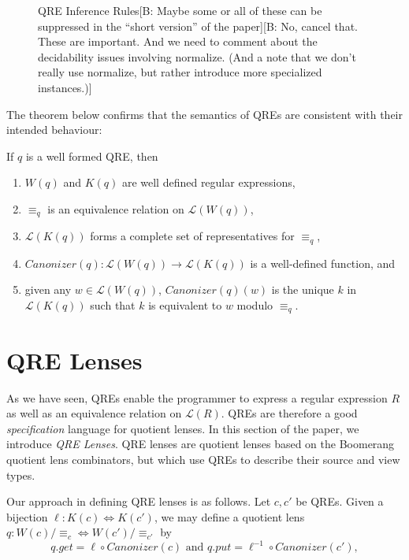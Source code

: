 \documentclass{svproc}
\newcommand{\FINISH}[3]{\ifdraft\textcolor{#1}{[#2: #3]}\fi}
\newcommand{\bcp}[1]{\FINISH{dkred}{B}{#1}}
\newcommand{\canonizer}{\ensuremath{\mathit{Canonizer}}}
\newcommand{\eqrel}[1]{\ensuremath{\equiv_{#1}}}
\begin{document}
\begin{figure}[t]
  \begin{prooftree}
  \end{prooftree}
  \caption{QRE Inference Rules\bcp{Maybe some or all of these can be
      suppressed in the ``short version'' of the paper}\bcp{No, cancel
      that.  These are important.  And we need to comment about the decidability
      issues involving normalize.  (And a note that we don't really use
      normalize, but rather introduce more specialized instances.)}}
  \label{fig:qrerules}
\end{figure}
The theorem below confirms that the semantics of QREs are consistent with their
intended behaviour:
\begin{theorem}
  If $q$ is a well formed QRE, then
  \begin{enumerate}
  \item $W(q)$ and $K(q)$ are well defined regular expressions,
  \item  $\eqrel{q}$ is an equivalence relation on $\mathcal{L}(W(q))$,
  \item  $\mathcal{L}(K(q))$ forms a complete set of representatives for
    $\eqrel{q}$,
  \item $\canonizer(q):\mathcal{L}(W(q)) \longrightarrow \mathcal{L}(K(q))$ is a
    well-defined function, and
  \item  given any $w \in \mathcal{L}(W(q))$, $\canonizer(q)(w)$ is the unique
    $k$ in $\mathcal{L}(K(q))$ such that $k$ is equivalent to $w$ modulo
    $\eqrel{q}$.
  \end{enumerate}
\end{theorem}

\section{QRE Lenses}
\label{QRE-lenses} 
As we have seen, QREs enable the programmer to express a regular expression $R$
as well as an equivalence relation on $\mathcal{L}(R)$. QREs are therefore a
good \textit{specification} language for quotient lenses. In this section of the
paper, we introduce \textit{QRE Lenses}. QRE lenses are quotient lenses based on
the Boomerang quotient lens combinators, but which use QREs to describe their
source and view types.

Our approach in defining QRE lenses is as follows. Let $c, c'$ be QREs. Given a
bijection $\ell : K(c) \Leftrightarrow K(c')$, we may define a quotient lens $q
: W(c)/\eqrel{c} \Leftrightarrow W(c')/\eqrel{c'}$ by
\begin{equation}\label{normalform}
  q.get = \ell \circ \canonizer(c) \text{ and } q.put = \ell^{-1} \circ
  \canonizer(c'),
\end{equation}
\end{document}
